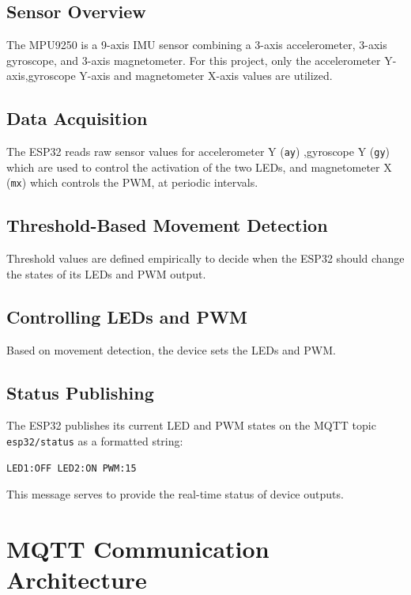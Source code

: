 \documentclass[a4paper,12pt]{article}
\begin{document}
\subsection{Sensor Overview}

The MPU9250 is a 9-axis IMU sensor combining a 3-axis accelerometer, 
3-axis gyroscope, and 3-axis magnetometer. 
For this project, only the accelerometer Y-axis,gyroscope Y-axis and magnetometer X-axis values 
are utilized.
\subsection{Data Acquisition}

The ESP32 reads raw sensor values for accelerometer Y (\texttt{ay}) 
,gyroscope Y (\texttt{gy}) which are used to control the activation of the two LEDs, 
and magnetometer X (\texttt{mx}) which controls the PWM, at periodic intervals.

\subsection{Threshold-Based Movement Detection}

Threshold values are defined empirically to decide when the ESP32 should 
change the states of its LEDs and PWM output.


\subsection{Controlling LEDs and PWM}

Based on movement detection, the device sets the LEDs and PWM.

\subsection{Status Publishing}

The ESP32 publishes its current LED and PWM states 
on the MQTT topic \texttt{esp32/status} as a formatted string:

{\scriptsize
\begin{verbatim}
LED1:OFF LED2:ON PWM:15
\end{verbatim}
}
This message serves to provide the
real-time status of device outputs.

\section{MQTT Communication Architecture}
\end{document}
